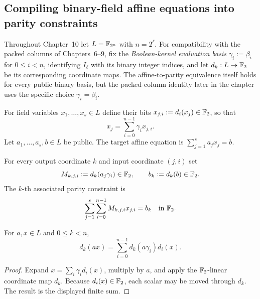 \subsection{Compiling binary-field affine equations into parity constraints}\label{sec:realize:binary}
Throughout Chapter~10 let $L=\mathbb{F}_{2^n}$ with $n=2^\ell$.
For compatibility with the packed columns of Chapters~6--9,
fix the \emph{Boolean-kernel evaluation basis}
$\gamma_i:=\beta_i$ for $0\le i<n$,
identifying $I_\ell$ with its binary integer indices,
and let $d_k:L\to\mathbb{F}_2$ be its corresponding
coordinate maps. The affine-to-parity equivalence
itself holds for every public binary basis, but
the packed-column identity later in the chapter
uses the specific choice $\gamma_i=\beta_i$.

\begin{definition}\label{def:realize:bits}
For field variables $x_1,\ldots,x_s\in L$ define their bits
$x_{j,i}:=d_i(x_j)\in\mathbb{F}_2$, so that
\[
 x_j=\sum_{i=0}^{n-1}\gamma_i x_{j,i}.
\]
Let $a_1,\ldots,a_s,b\in L$ be public.
The target affine equation is
$\sum_{j=1}^s a_jx_j=b$.
\end{definition}

\begin{definition}\label{def:realize:matrix}
For every output coordinate $k$ and input coordinate $(j,i)$ set
\[
 M_{k,j,i}:=d_k(a_j\gamma_i)\in\mathbb{F}_2,
 \qquad b_k:=d_k(b)\in\mathbb{F}_2.
\]
The $k$-th associated parity constraint is
\[
 \sum_{j=1}^s\sum_{i=0}^{n-1}M_{k,j,i}x_{j,i}
 =b_k\quad\text{in }\mathbb{F}_2.
\]
\end{definition}

\begin{lemma}\label{lem:realize:scaled}
For $a,x\in L$ and $0\le k<n$,
\[
 d_k(ax)=\sum_{i=0}^{n-1}d_k(a\gamma_i)d_i(x).
\]
\end{lemma}
\begin{proof}
Expand $x=\sum_i\gamma_id_i(x)$, multiply by $a$, and apply
the $\mathbb{F}_2$-linear coordinate map $d_k$.
Because $d_i(x)\in\mathbb{F}_2$, each scalar may be moved through $d_k$.
The result is the displayed finite sum.
\end{proof}

